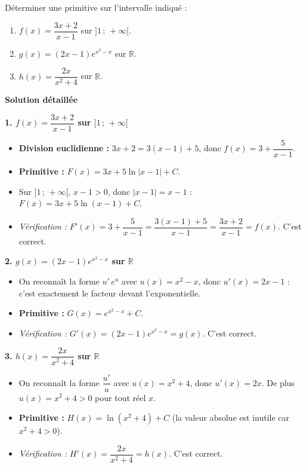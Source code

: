 \documentclass[11pt]{article}
\begin{document}
\begin{exoresolu}
Déterminer une primitive sur l'intervalle indiqué :
\begin{enumerate}
    \item $f(x) = \dfrac{3x+2}{x-1}$ sur $]1\,;\,+\infty[$.
    \item $g(x) = (2x-1)e^{x^2-x}$ sur $\mathbb{R}$.
    \item $h(x) = \dfrac{2x}{x^2+4}$ sur $\mathbb{R}$.
\end{enumerate}
\tcblower
\textbf{Solution détaillée}

\textbf{1. $f(x) = \dfrac{3x+2}{x-1}$ sur $]1\,;\,+\infty[$}
\begin{itemize}
    \item \textbf{Division euclidienne :} $3x+2 = 3(x-1) + 5$, donc $f(x) = 3 + \dfrac{5}{x-1}$.
    \item \textbf{Primitive :} $F(x) = 3x + 5\ln|x-1| + C$.
    \item Sur $]1\,;\,+\infty[$, $x-1 > 0$, donc $|x-1| = x-1$ : $F(x) = 3x + 5\ln(x-1) + C$.
    \item \emph{Vérification :} $F'(x) = 3 + \dfrac{5}{x-1} = \dfrac{3(x-1)+5}{x-1} = \dfrac{3x+2}{x-1} = f(x)$. C'est correct.
\end{itemize}

\textbf{2. $g(x) = (2x-1)e^{x^2-x}$ sur $\mathbb{R}$}
\begin{itemize}
    \item On reconnaît la forme $u'\,e^{u}$ avec $u(x) = x^2 - x$, donc $u'(x) = 2x - 1$ : c'est exactement le facteur devant l'exponentielle.
    \item \textbf{Primitive :} $G(x) = e^{x^2-x} + C$.
    \item \emph{Vérification :} $G'(x) = (2x-1)e^{x^2-x} = g(x)$. C'est correct.
\end{itemize}

\textbf{3. $h(x) = \dfrac{2x}{x^2+4}$ sur $\mathbb{R}$}
\begin{itemize}
    \item On reconnaît la forme $\dfrac{u'}{u}$ avec $u(x) = x^2+4$, donc $u'(x) = 2x$. De plus $u(x) = x^2+4 > 0$ pour tout réel $x$.
    \item \textbf{Primitive :} $H(x) = \ln(x^2+4) + C$ (la valeur absolue est inutile car $x^2+4>0$).
    \item \emph{Vérification :} $H'(x) = \dfrac{2x}{x^2+4} = h(x)$. C'est correct.
\end{itemize}
\end{exoresolu}
\end{document}

